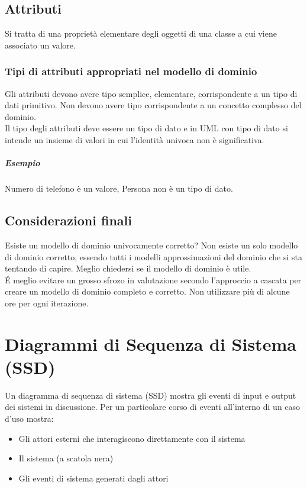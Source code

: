 \section{Attributi}
Si tratta di una proprietà elementare degli oggetti di una classe a cui
viene associato un valore.
\subsection*{Tipi di attributi appropriati nel modello di dominio}
Gli attributi devono avere tipo semplice, elementare, corrispondente a un tipo di dati
primitivo. Non devono avere tipo corrispondente a un concetto complesso del
dominio.
\\ Il tipo degli attributi deve essere un tipo di dato e in UML con tipo di dato
si intende un insieme di valori in cui l'identità univoca non è significativa.
\paragraph*{Esempio} Numero di telefono è un valore, Persona non è un tipo di dato.
\section{Considerazioni finali}
Esiste un modello di dominio univocamente corretto?
Non esiste un solo modello di dominio corretto, essendo tutti i modelli approssimazioni
del dominio che si sta tentando di capire. Meglio chiedersi se il modello di dominio
è utile.
\\ \'E meglio evitare un grosso sfrozo in valutazione secondo l'approccio a cascata per
creare un modello di dominio completo e corretto. Non utilizzare più di alcune ore per
ogni iterazione.

\chapter{Diagrammi di Sequenza di Sistema (SSD)}
Un diagramma di sequenza di sistema (SSD) mostra gli eventi di input e output
dei sistemi in discussione. Per un particolare corso di eventi all'interno di un caso
d'uso mostra:
\begin{itemize}
    \item Gli attori esterni che interagiscono direttamente con il sistema
    \item Il sistema (a scatola nera)
    \item Gli eventi di sistema generati dagli attori
\end{itemize}
